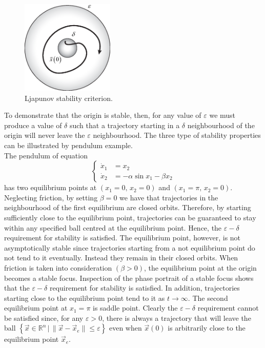 \documentclass[11pt,a4paper,oneside]{book}
\numberwithin{equation}{section}
\theoremstyle{it}
\theoremstyle{definition}
\begin{document}
\begin{figure}[H]
	\centering
	\includegraphics[width = 125pt, 
	keepaspectratio]{figures/ljapunov/lyapunov_stability.eps}
	\captionsetup{width=0.75\textwidth}		
	\caption{Ljapunov stability criterion.}
	\label{figure_lypstab}
\end{figure}
To demonstrate that the origin is stable, then, for any value of $\varepsilon$ 
we must produce a value of $\delta$ such that a trajectory starting in a 
$\delta$ neighbourhood of the origin will never leave the $\varepsilon$ 
neighbourhood. The three type of stability properties can be illustrated by 
pendulum example.\\The pendulum of equation 
\begin{equation*}
	\left\lbrace \begin{aligned}
		\dot{x}_1 &=  x_2 \\[6pt] 
		\dot{x}_2 &= -\alpha\sin x_1 -\beta x_2
	\end{aligned}\right. 
\end{equation*}
has two equilibrium points at $(x_1=0,\,x_2=0)$ and $(x_1=\pi,\,x_2=0)$. 
Neglecting friction, by setting $\beta=0$ we have that trajectories in the 
neighbourhood of the first equilibrium are closed orbits. Therefore, by 
starting sufficiently close to the equilibrium point, trajectories can be 
guaranteed to stay within any specified ball centred at the equilibrium point. 
Hence, the $\varepsilon-\delta$ requirement for stability is satisfied. The 
equilibrium point, however, is not asymptotically stable since trajectories 
starting from a not equilibrium point do not tend to it eventually. Instead 
they remain in their closed orbits. When friction is taken into consideration 
$(\beta>0)$, the equilibrium point at the origin becomes a stable focus. 
Inspection of the phase portrait of a stable focus shows that the 
$\varepsilon-\delta$ requirement for stability is satisfied. In addition, 
trajectories starting close to the equilibrium point tend to it as 
$t\rightarrow\infty$. The second equilibrium point at $x_1=\pi$ is saddle 
point. Clearly the $\varepsilon-\delta$ requirement cannot be satisfied since, 
for any $\varepsilon>0$, there is always a trajectory that will leave the ball 
$\left\lbrace \vec{x}\in\mathbb{R}^n\,|\, 
\|\vec{x}-\vec{x}_e\|\le\varepsilon\right\rbrace $ even when $\vec{x}(0)$ is 
arbitrarily close to the equilibrium point $\vec{x}_e$.
\end{document}
